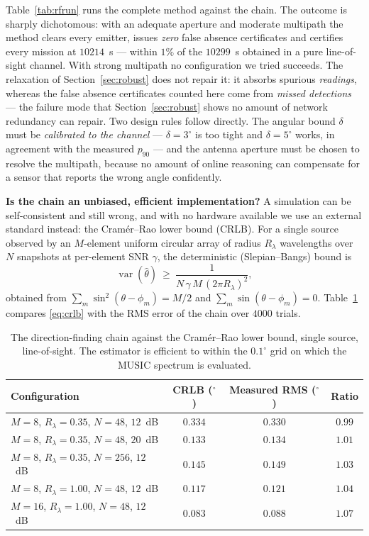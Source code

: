 \documentclass[journal,10pt]{IEEEtran}
\theoremstyle{definition}
\begin{document}
Table~\ref{tab:rfrun} runs the complete method against the chain. The outcome is sharply
dichotomous: with an adequate aperture and moderate multipath the method clears every emitter,
issues \emph{zero} false absence certificates and certifies every mission at $10214$~s ---
within $1\%$ of the $10299$~s obtained in a pure line-of-sight channel. With
strong multipath no configuration we tried succeeds. The relaxation of
Section~\ref{sec:robust} does not repair it: it absorbs spurious \emph{readings}, whereas the
false absence certificates counted here come from \emph{missed detections} --- the failure mode
that Section~\ref{sec:robust} shows no amount of network redundancy can repair. Two design rules follow directly. The angular bound $\delta$ must be
\emph{calibrated to the channel} --- $\delta=3^\circ$ is too tight and $\delta=5^\circ$ works, in
agreement with the measured $p_{90}$ --- and the antenna aperture must be chosen to resolve the
multipath, because no amount of online reasoning can compensate for a sensor that reports the
wrong angle confidently.


\noindent\textbf{Is the chain an unbiased, efficient implementation?} A simulation can be
self-consistent and still wrong, and with no hardware available we use an external standard
instead: the Cram\'er--Rao lower bound (CRLB). For a single source observed by an $M$-element
uniform circular array of radius $R_\lambda$ wavelengths over $N$ snapshots at per-element SNR
$\gamma$, the deterministic (Slepian--Bangs) bound is
\begin{equation}
\operatorname{var}(\hat\theta)\ \ge\ \frac{1}{N\,\gamma\,M\,(2\pi R_\lambda)^2},
\label{eq:crlb}
\end{equation}
obtained from $\sum_m\sin^2(\theta-\phi_m)=M/2$ and $\sum_m\sin(\theta-\phi_m)=0$. Table~\ref{tab:crlb}
compares \eqref{eq:crlb} with the RMS error of the chain over $4000$ trials.

\begin{table}[t]
\caption{The direction-finding chain against the Cram\'er--Rao lower bound, single source,
line-of-sight. The estimator is efficient to within the $0.1^\circ$ grid on which the MUSIC
spectrum is evaluated.}
\label{tab:crlb}
\centering
\small
\begin{tabular}{lccc}
\toprule
Configuration & CRLB ($^\circ$) & Measured RMS ($^\circ$) & Ratio \\
\midrule
$M{=}8$, $R_\lambda{=}0.35$, $N{=}48$, $12$~dB   & $0.334$ & $0.330$ & $0.99$ \\
$M{=}8$, $R_\lambda{=}0.35$, $N{=}48$, $20$~dB   & $0.133$ & $0.134$ & $1.01$ \\
$M{=}8$, $R_\lambda{=}0.35$, $N{=}256$, $12$~dB  & $0.145$ & $0.149$ & $1.03$ \\
$M{=}8$, $R_\lambda{=}1.00$, $N{=}48$, $12$~dB   & $0.117$ & $0.121$ & $1.04$ \\
$M{=}16$, $R_\lambda{=}1.00$, $N{=}48$, $12$~dB  & $0.083$ & $0.088$ & $1.07$ \\
\bottomrule
\end{tabular}
\end{table}
\end{document}
